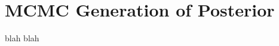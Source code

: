\documentclass[main.tex]{subfiles}
\begin{document}
\newpage
\setcounter{section}{5}
\section{MCMC Generation of Posterior}

blah blah
\end{document}
